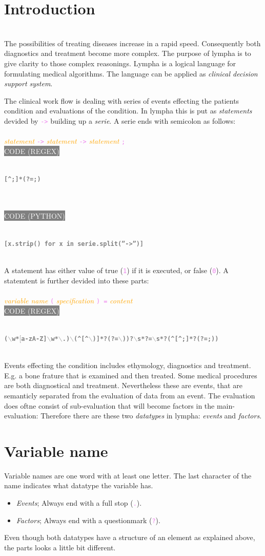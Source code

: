 \documentclass[15pt,a4paper,oneside]{report}
\newcommand{\regex}[1]{{\tiny\\\colorbox{grey}{\textcolor{white}{CODE (REGEX)}\hspace{0.87\textwidth}}}\vspace{-2.2em}\\\begin{framed}\bf{\textcolor{grey}{\vspace{-1.5em}\\\texttt{\small #1}}}\vspace{-0.33em}\end{framed}\vspace{-0.75em}}
\newcommand{\python}[1]{{\tiny\\\colorbox{grey}{\textcolor{white}{\tiny CODE (PYTHON)}\hspace{0.855\textwidth}}}\vspace{-2.2em}\\\begin{framed}\bf{\textcolor{grey}{\vspace{-1.5em}\\\texttt{\small #1}}}\vspace{-0.33em}\end{framed}\vspace{-0.75em}}
\newcommand{\code}[1]{{\textcolor{violet}{\texttt{\small #1}}}}
\newcommand{\comment}[1]{{\textcolor{orange}{\it #1}}}
\begin{document}
\section{Introduction}
\ \\
The possibilities of treating diseases increase in a rapid speed. Consequently both diagnostics and treatment become more complex. The purpose of {\sc lympha} is to give clarity to those complex reasonings. {\sc Lympha} is a logical language for formulating medical algorithms. The language can be applied as {\it clinical decision support system}.

The clinical work flow is dealing with series of events effecting the patients condition and evaluations of the condition. In {\sc lympha} this is put as {\it statements} devided by \code{->} building up a {\it serie}. A serie ends with semicolon as follows:\\\\
\comment{statement} \code{->} \comment{statement} \code{->} \comment{statement} \code{;}
\regex{[\textasciicircum ;]*(?=;)}
\ \vspace{-2em}\\
\python{[x.strip() for x in serie.split(''->'')]}
\ \\
A statement has either value of true (\code{1}) if it is executed, or false (\code{0}). A statemtent is further devided into these parts:\\\\
\comment{variable name} \code{(} \comment{specification} \code{) =} \comment{content}
\regex{($\backslash$w*$[$a-zA-Z]$\backslash$w*$\backslash$.)$\backslash$(\textasciicircum[\textasciicircum$\backslash$)]*?(?=$\backslash$))?$\backslash$s*?=$\backslash$s*?(\textasciicircum[\textasciicircum ;]*?(?=;))}
\ \\
Events effecting the condition includes ethymology, diagnostics and treatment. E.g. a bone frature that is examined and then treated. Some medical procedures are both diagnostical and treatment. Nevertheless these are events, that are semanticly separated from the evaluation of data from an event. The evaluation does oftne consist of sub-evaluation that will become factors in the main-evaluation: Therefore there are these two {\it datatypes} in {\sc lympha}: {\it events} and {\it factors}.
\section{Variable name}
Variable names are one word with at least one letter. The last character of the name indicates what datatype the variable has.
\begin{itemize}
\item {\it Events}; Always end with a full stop (\code{.}).
\item {\it Factors}; Always end with a questionmark (\code{?}).
\end{itemize}
Even though both datatypes have a structure of an element as explained above, the parts looks a little bit different.
\end{document}
